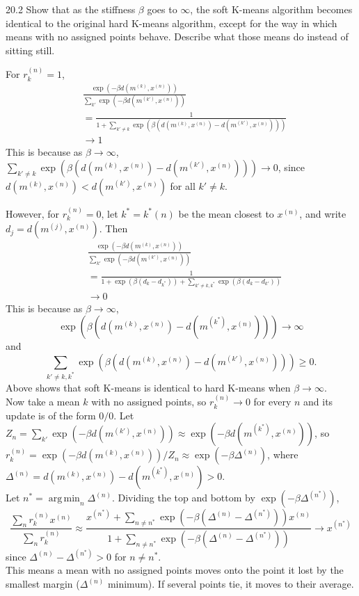 \documentclass[12pt, a4paper]{article}
\DeclareMathOperator*{\argmin}{arg\,min}
\begin{document}
\begin{prob}{20.2}
Show that as the stiffness $\beta$ goes to $\infty$, the soft K-means algorithm becomes identical to the original hard K-means algorithm, except for the way in which means with no assigned points behave. Describe what those means do instead of sitting still.
\end{prob}
\begin{sol}
For $r_k^{(n)} = 1$, 
\begin{align*}
&\frac{\exp(-\beta d(m^{(k)}, x^{(n)}))}{\sum_{k'}\exp(-\beta d(m^{(k')}, x^{(n)}))}\\
&=\frac{1}{1 + \sum_{k' \neq k}\exp(\beta (d(m^{(k)}, x^{(n)}) - d(m^{(k')}, x^{(n)})))} \\
&\rightarrow 1
\end{align*}
This is because as $\beta \rightarrow \infty$, $\sum_{k' \neq k}\exp(\beta (d(m^{(k)}, x^{(n)}) - d(m^{(k')}, x^{(n)}))) \rightarrow 0$, since $d(m^{(k)}, x^{(n)}) < d(m^{(k')}, x^{(n)})$ for all $k' \neq k$.

However, for $r_k^{(n)} = 0$, let $k^* = k^*(n)$ be the mean closest to $x^{(n)}$, and write $d_j = d(m^{(j)}, x^{(n)})$. Then
\begin{align*}
&\frac{\exp(-\beta d(m^{(k)}, x^{(n)}))}{\sum_{k'}\exp(-\beta d(m^{(k')}, x^{(n)}))}\\
&=\frac{1}{1 + \exp(\beta (d_k - d_{k^*})) + \sum_{k' \neq k, k^*}\exp(\beta (d_k - d_{k'}))} \\
&\rightarrow 0
\end{align*}
This is because as $\beta \rightarrow \infty$, $$\exp(\beta (d(m^{(k)}, x^{(n)}) - d(m^{(k^*)}, x^{(n)}))) \rightarrow \infty$$
 and $$\sum_{k' \neq k, k^*}\exp(\beta (d(m^{(k)}, x^{(n)}) - d(m^{(k')}, x^{(n)}))) \geq 0.$$
Above shows that soft K-means is identical to hard K-means when $\beta \rightarrow \infty$. \\

Now take a mean $k$ with no assigned points, so $r_k^{(n)} \rightarrow 0$ for every $n$ and its update is of the form $0/0$.
Let $Z_n = \sum_{k'} \exp(-\beta d(m^{(k')}, x^{(n)})) \approx \exp(-\beta d(m^{(k^*)}, x^{(n)}))$, so
$r_k^{(n)} = \exp(-\beta d(m^{(k)}, x^{(n)})) / Z_n \approx \exp(-\beta \Delta^{(n)})$, where
$\Delta^{(n)} = d(m^{(k)}, x^{(n)}) - d(m^{(k^*)}, x^{(n)}) > 0$. \\
Let $n^* = \argmin_n \Delta^{(n)}$. Dividing the top and bottom by $\exp(-\beta \Delta^{(n^*)})$,
$$\frac{\sum_{n} r_k^{(n)} x^{(n)}}{\sum_{n} r_k^{(n)}}
\approx \frac{x^{(n^*)} + \sum_{n \neq n^*} \exp(-\beta (\Delta^{(n)} - \Delta^{(n^*)})) x^{(n)}}{1 + \sum_{n \neq n^*} \exp(-\beta (\Delta^{(n)} - \Delta^{(n^*)}))}
\rightarrow x^{(n^*)}$$
since $\Delta^{(n)} - \Delta^{(n^*)} > 0$ for $n \neq n^*$. \\
This means a mean with no assigned points moves onto the point it lost by the smallest margin ($\Delta^{(n)}$ minimum). If several points tie, it moves to their average.
\end{sol}
\bigskip
\end{document}
